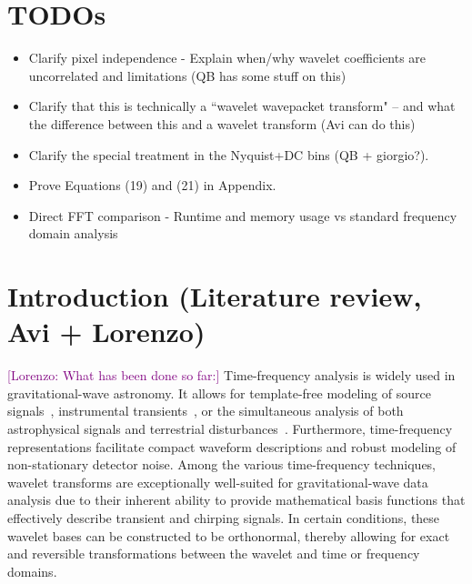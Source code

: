 \documentclass[%
 reprint,
superscriptaddress,
nofootinbib,
 amsmath,amssymb,
 aps,
colorlinks = true, 
linkcolor = blue, 
urlcolor = blue, 
citecolor = blue, 
anchorcolor = blue,
]{revtex4-2}
\newcommand{\ls}[1]{\textcolor{purple}{[Lorenzo: #1]}}
\begin{document}
\maketitle

\section{TODOs}

\begin{itemize}
    \item Clarify pixel independence - Explain when/why wavelet coefficients are uncorrelated and limitations (QB has some stuff on this) 
    \item Clarify that this is technically a ``wavelet wavepacket transform" – and what the difference between this and a wavelet transform (Avi can do this) 
    \item Clarify the special treatment in the Nyquist+DC bins (QB + giorgio?).
    \item Prove Equations (19) and (21) in Appendix. 
    \item Direct FFT comparison - Runtime and memory usage vs standard frequency domain analysis
\end{itemize}







\section{Introduction (Literature review, Avi + Lorenzo)}
\ls{What has been done so far:}
Time-frequency analysis is widely used in gravitational-wave astronomy. 
It allows for template-free modeling of source signals~\cite{krolak_1996,Virtuoso2024},  instrumental transients~\cite{robinet2020}, or the simultaneous analysis of both astrophysical signals and terrestrial disturbances~\cite{Cornish_2015}.
Furthermore, time-frequency representations facilitate compact waveform descriptions and robust modeling of non-stationary detector noise. 
Among the various time-frequency techniques, wavelet transforms are exceptionally well-suited for gravitational-wave data analysis due to their inherent ability to provide mathematical basis functions that effectively describe transient and chirping signals.
In certain conditions, these wavelet bases can be constructed to be orthonormal, thereby allowing for exact and reversible transformations between the wavelet and time or frequency domains. 
\end{document}
